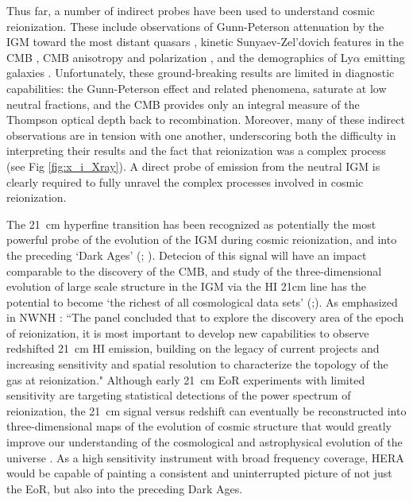 \documentclass[preprint]{aastex}
\begin{document}
Thus far, a number of indirect probes have been used to understand cosmic
reionization.  These include observations of Gunn-Peterson attenuation by the
IGM toward the most distant quasars \citep{fan_et_al2006,bouwens_et_al2010},
kinetic Sunyaev-Zel'dovich features in the CMB \citep{zahn_et_al2012}, CMB
anisotropy and polarization \citep{page_et_al2007,planck_et_al2013}, and the
demographics of Ly$\alpha$ emitting galaxies
\citep{http://adsabs.harvard.edu/abs/2013arXiv1308.5985T}.  Unfortunately,
these ground-breaking results are limited in diagnostic capabilities: the
Gunn-Peterson effect and related phenomena, saturate at low neutral fractions,
and the CMB provides only an integral measure of the Thompson optical depth
back to recombination.  Moreover, many of these indirect observations are in
tension with one another, underscoring both the difficulty in interpreting
their results and the fact that reionization was a complex process (see Fig \ref{fig:x_i_Xray}).
A direct probe of emission from the neutral IGM is clearly required to fully
unravel the complex processes involved in cosmic reionization. 

The 21~cm hyperfine transition has been recognized as potentially the most
powerful probe of the evolution of the IGM during cosmic reionization, and into
the preceding `Dark Ages' (\citealt{morales_wyithe2010};
\citealt{furlanetto_et_al2006}). Detecion of this signal will have an impact
comparable to the discovery of the CMB, and study of the three-dimensional
evolution of large scale structure in the IGM via the HI 21cm line has the
potential to become `the richest of all cosmological data sets'
(\citealt{barkana_loeb2005a};\citealt{loeb_zaldarriaga2004}).  As emphasized in
NWNH \citep{astro2010}: ``The panel concluded that to explore the discovery
area of the epoch of reionization, it is most important to develop new
capabilities to observe redshifted 21~cm HI emission, building on the legacy of
current projects and increasing sensitivity and spatial resolution to
characterize the topology of the gas at reionization."  Although early 21~cm
EoR experiments with limited sensitivity are targeting statistical detections
of the power spectrum of reionization, the 21~cm signal versus redshift can
eventually be reconstructed into three-dimensional maps of the evolution of
cosmic structure that would greatly improve our understanding of the
cosmological and astrophysical evolution of the universe
\citep{furlanetto_et_al2006,mao_et_al2008,morales_wyithe2010}. As a high
sensitivity instrument with broad frequency coverage, HERA would be capable of
painting a consistent and uninterrupted picture of not just the EoR, but also
into the preceding Dark Ages.  
\end{document}
